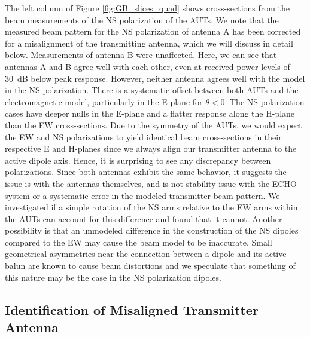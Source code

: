 \documentclass[preprint2,numberedappendix,tighten,twocolappendix]{aastex6}
\begin{document}
The left column of Figure \ref{fig:GB_slices_quad} shows cross-sections from the beam measurements of the NS polarization of the AUTs.  We note that the measured beam pattern for the NS polarization of antenna A has been corrected for a misalignment of the transmitting antenna, which we will discuss in detail below.  Measurements of antenna B were unaffected.   Here, we can see that antennas A and B agree well with each other, even at received power levels of 30~dB below peak response.  However, neither antenna agrees well with the model in the NS polarization.  There is a systematic offset between both AUTs and the electromagnetic model, particularly in the E-plane for $\theta<0$\arcdeg{}.  The NS polarization cases have deeper nulls in the E-plane and a flatter response along the H-plane than the EW cross-sections.   Due to the symmetry of the AUTs, we would expect the EW and NS polarizations to yield identical beam cross-sections in their respective E and H-planes since we always align our transmitter antenna to the active dipole axis.  Hence, it is surprising to see any discrepancy between polarizations.  Since both antennas exhibit the same behavior, it suggests the issue is with the antennas themselves, and is not stability issue with the ECHO system or a systematic error in the modeled transmitter beam pattern.  We investigated if a simple rotation of the NS arms relative to the EW arms within the AUTs can account for this difference and found that it cannot.  Another possibility is that an unmodeled difference in the construction of the NS dipoles compared to the EW may cause the beam model to be inaccurate.  Small geometrical asymmetries near the connection between a dipole and its active balun are known to cause beam distortions and we speculate that something of this nature may be the case in the NS polarization dipoles. 


\subsection{Identification of Misaligned Transmitter Antenna}
\label{sec:tilt}
\end{document}
